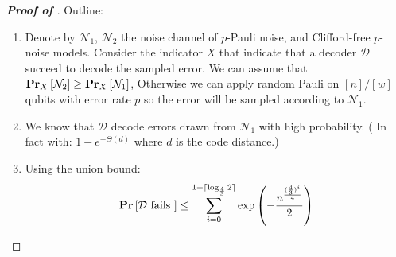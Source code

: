 \documentclass[manuscript,screen,review]{acmart}
\begin{document}
\begin{proof}[\textbf{Proof of }]

  Outline: 
  \begin{enumerate}
    \item Denote by $\mathcal{N}_{1}$, $\mathcal{N}_{2}$ the noise channel of $p$-Pauli noise, and Clifford-free $p$-noise models. Consider the indicator $X$ that indicate that a decoder $\mathcal{D}$ succeed to decode the sampled error. We can assume that $\prbm{\mathcal{N}_{2}}{X} \ge \prbm{\mathcal{N}_{1}}{X}$, Otherwise we can apply random Pauli on $[n]/[w]$ qubits with error rate $p$ so the error will be sampled according to $\mathcal{N}_1$.
    \item We know that $\mathcal{D}$ decode errors drawn from $\mathcal{N}_{1}$ with high probability. ( In fact with:  $1 - e^{-\Theta(d)}$ where $d$ is the code distance.)   
    \item Using the union bound: \begin{equation*}
        \begin{split}
          \prb{ \mathcal{D} \text{ fails } } \le \sum_{i=0}^{1 + \lceil \log_{\frac{4}{3}}{2} \rceil }{ \exp \left(  - \frac{n^\frac{(\frac{4}{3})^{i}}{4}  }{2} \right)  }
        \end{split}
      \end{equation*}
\end{enumerate}


\end{proof}




%
\cite{leverrier2022quantum}
\cite{moore1998parallel}
\cite{bravyi2012magic}
\cite{Tillich_2014}
\cite{meier2012magicstate}

\printbibliography
\end{document}
